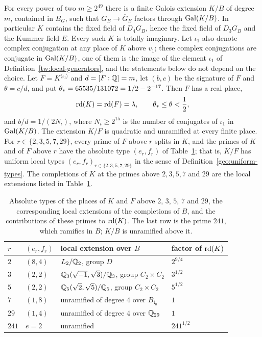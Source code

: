 \begin{theorem}\label{tw:field-family}
For every power of two $m\ge2^{49}$ there is a finite Galois extension
$K/B$ of degree $m$, contained in $B_G$, such that $G_B\to\overline G_B$
factors through $\operatorname{Gal}(K/B)$. In particular $K$ contains the fixed field of
$D_4G_B$, hence the fixed field of $D_3G_B$ and the Kummer field $E$. Every
such $K$ is totally imaginary. Let $\iota_1$ also denote complex
conjugation at any place of $K$ above $v_1$; these complex conjugations are
conjugate in $\operatorname{Gal}(K/B)$, one of them is the image of the element $\iota_1$
of Definition~\ref{tw:local-generators}, and the statements below do not
depend on the choice. Let $F=K^{\langle\iota_1\rangle}$ and
$d=[F:\mathbb Q]=m$, let $(b,c)$ be the signature of $F$ and $\theta=c/d$, and put
$\theta_*=65535/131072=1/2-2^{-17}$. Then $F$ has a real place,
\[
 \operatorname{rd}(K)=\operatorname{rd}(F)=\lambda,\qquad \theta_*\le\theta<\frac12 ,
\]
and $b/d=1/(2N_\iota)$, where $N_\iota\ge2^{15}$ is the number of conjugates
of $\iota_1$ in $\operatorname{Gal}(K/B)$. The extension $K/F$ is quadratic and unramified
at every finite place. For $r\in\{2,3,5,7,29\}$, every prime of $F$ above $r$
splits in $K$, and the primes of $K$ and of $F$ above $r$ have the absolute
type $(e_r,f_r)$ of Table~\ref{tw:types-table}; that is, $K/F$ has uniform
local types $(e_r,f_r)_{r\in\{2,3,5,7,29\}}$ in the sense of
Definition~\ref{geo:uniform-types}. The completions of $K$ at the primes above
$2,3,5,7$ and $29$ are the local extensions listed in
Table~\ref{tw:types-table}.
\end{theorem}

\begin{table}[htbp]
\centering
\caption{Absolute types of the places of $K$ and $F$ above $2$, $3$, $5$, $7$
and $29$, the corresponding local extensions of the completions of $B$, and
the contributions of these primes to $\operatorname{rd}(K)$. The last row is the prime
$241$, which ramifies in $B$; $K/B$ is unramified above it.}
\label{tw:types-table}
\begin{tabular}{llll}
\toprule
$r$ & $(e_r,f_r)$ & local extension over $B$ & factor of $\operatorname{rd}(K)$\\
\midrule
$2$ & $(8,4)$ & $L_2/\mathbb Q_2$, group $D$ & $2^{9/4}$\\
$3$ & $(2,2)$ & $\mathbb Q_3(\sqrt{-1},\sqrt3)/\mathbb Q_3$, group $C_2\times C_2$ & $3^{1/2}$\\
$5$ & $(2,2)$ & $\mathbb Q_5(\sqrt2,\sqrt5)/\mathbb Q_5$, group $C_2\times C_2$ & $5^{1/2}$\\
$7$ & $(1,8)$ & unramified of degree $4$ over $B_{\mathfrak t_0}$ & $1$\\
$29$ & $(1,4)$ & unramified of degree $4$ over $\mathbb Q_{29}$ & $1$\\
\midrule
$241$ & $e=2$ & unramified & $241^{1/2}$\\
\bottomrule
\end{tabular}
\end{table}

